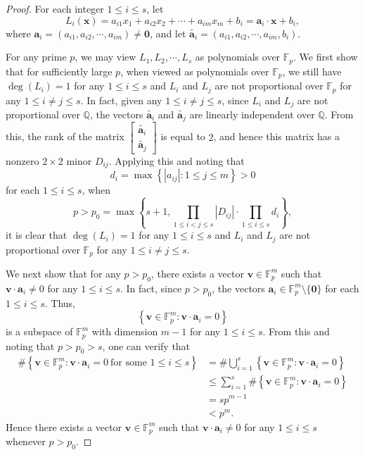 \documentclass[12pt]{amsart}
\def\a{{\bm a}}
\def\v{{\bm v}}
\def\x{{\bm x}}
\def\0{{\bm 0}}
\theoremstyle{plain}
\theoremstyle{remark}
\begin{document}
	\begin{proof}
		For each integer $1\le i\le s$, let 
		$$L_i(\x)=a_{i1}x_1+a_{i2}x_2+\cdots+a_{im}x_m+b_i=\a_i\cdot \x+b_i,$$
		where $\a_i=(a_{i1},a_{i2},\cdots,a_{im})\neq \0$, and let $\widetilde{\a_i}=(a_{i1},a_{i2},\cdots,a_{im},b_i)$. 
		
		For any prime $p$, we may view $L_1, L_2, \cdots,L_s$ as polynomials over $\mathbb{F}_p$. We first show that for sufficiently large $p$, when viewed as polynomials over $\mathbb{F}_p$, we still have $\deg(L_i)=1$ for any $1\le i\le s$ and $L_i$ and $L_j$ are not proportional over $\mathbb{F}_p$ for any $1\le i\neq j\le s$. In fact, given any $1\le i\neq j\le s$, since $L_i$ and $L_j$ are not proportional over $\mathbb{Q}$, the vectors $\widetilde{\a_i}$ and $\widetilde{\a_j}$ are linearly independent over $\mathbb{Q}$. From this, the rank of the matrix $\begin{bmatrix}
			\widetilde{\a_i}\\
			\widetilde{\a_j}
		\end{bmatrix}$ is equal to $2$, and hence this matrix
		has a nonzero $2\times 2$ minor $D_{ij}$. Applying this and noting that 
		$$d_i=\max\left\{|a_{ij}|: 1\le j\le m\right\}>0$$
		for each $1\le i\le s$, 
		 when 
		$$p>p_0=\max\left\{s+1, \prod_{1\le i<j\le s}|D_{ij}|\cdot \prod_{1\le i\le s}d_i\right\},$$
		it is clear that $\deg(L_i)=1$ for any $1\le i\le s$ and $L_i$ and $L_j$ are not proportional over $\mathbb{F}_p$ for any $1\le i\neq j\le s$.
		
		We next show that for any $p>p_0$, there exists a vector $\v\in\mathbb{F}_p^m$ such that $\v\cdot \a_i\neq 0$ for any $1\le i\le s$. In fact, since $p>p_0$, the vectors $\a_i\in\mathbb{F}_p^m\setminus\{\0\}$ for each $1\le i\le s$. Thus, 
		$$\left\{\v\in\mathbb{F}_p^m: \v\cdot \a_i=0\right\}$$
		is a subspace of $\mathbb{F}_p^m$ with dimension $m-1$ for any $1\le i\le s$. From this and noting that $p>p_0>s$, one can verify that 
		\begin{align*}
			\#\left\{\v\in\mathbb{F}_p^m: \v\cdot \a_i=0\ \text{for some $1\le i\le s$}\right\}
&=\#\bigcup_{i=1}^s\left\{\v\in\mathbb{F}_p^m: \v\cdot \a_i=0\right\}\\
&\le \sum_{i=1}^s\#\left\{\v\in\mathbb{F}_p^m: \v\cdot \a_i=0\right\}\\
&=sp^{m-1}\\
&<p^m.
		\end{align*}
		Hence there exists a vector $\v\in\mathbb{F}_p^m$ such that $\v\cdot \a_i\neq 0$ for any $1\le i\le s$ whenever $p>p_0$. 
		

\end{proof}
\end{document}

